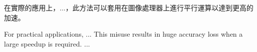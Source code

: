 \begin{abstractzh}

在實際的應用上，...，此方法可以套用在圖像處理器上進行平行運算以達到更高的加速。

\end{abstractzh}

\begin{abstracten}
	
For practical applications, ... This misuse results in huge accuracy loss when a large speedup is required. ...

\end{abstracten}

